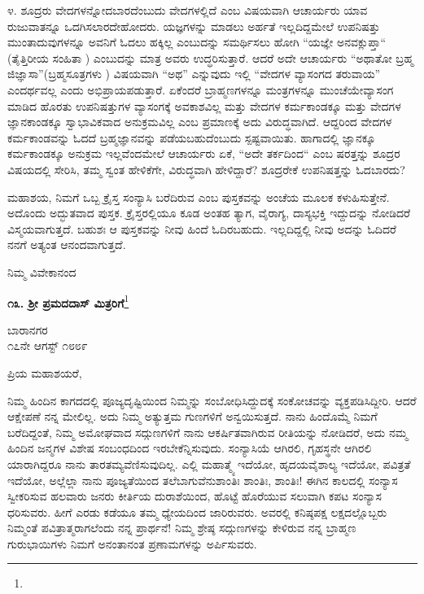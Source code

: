 ೪. ಶೂದ್ರರು ವೇದಗಳನ್ನೋದಬಾರದೆಂಬುದು ವೇದಗಳಲ್ಲಿದೆ ಎಂಬ ವಿಷಯವಾಗಿ ಆಚಾರ್ಯರು ಯಾವ ರುಜುವಾತನ್ನೂ ಒದಗಿಸಲಾರದೇಹೋದರು. ಯಜ್ಞಗಳನ್ನು ಮಾಡಲು ಅರ್ಹತೆ ಇಲ್ಲದಿದ್ದಮೇಲೆ ಉಪನಿಷತ್ತು ಮುಂತಾದುವುಗಳನ್ನೂ ಅವನಿಗೆ ಓದಲು ಹಕ್ಕಿಲ್ಲ ಎಂಬುದನ್ನು ಸಮರ್ಥಿಸಲು ಹೋಗಿ “ಯಜ್ಞೇ ಅನವಕ್ಲುಪ್ತಾ“ (ತೈತ್ತಿರೀಯ ಸಂಹಿತಾ ) ಎಂಬುದನ್ನು ಮಾತ್ರ ಅವರು ಉದ್ಧರಿಸುತ್ತಾರೆ. ಆದರೆ ಅದೇ ಆಚಾರ್ಯರು “ಅಥಾತೋ ಬ್ರಹ್ಮ ಜಿಜ್ಞಾಸಾ”(ಬ್ರಹ್ಮಸೂತ್ರಗಳು ) ವಿಷಯವಾಗಿ “ಅಥ” ಎನ್ನುವುದು ಇಲ್ಲಿ “ವೇದಗಳ ವ್ಯಾಸಂಗದ ತರುವಾಯ” ಎಂದರ್ಥವಲ್ಲ ಎಂದು ಅಭಿಪ್ರಾಯಪಡುತ್ತಾರೆ. ಏಕೆಂದರೆ ಬ್ರಾಹ್ಮಣಗಳನ್ನೂ ಮಂತ್ರಗಳನ್ನೂ ಮುಂಚೆಯೇ\break ವ್ಯಾಸಂಗ ಮಾಡಿದ ಹೊರತು ಉಪನಿಷತ್ತುಗಳ ವ್ಯಾಸಂಗಕ್ಕೆ ಅವಕಾಶವಿಲ್ಲ ಮತ್ತು ವೇದಗಳ ಕರ್ಮಕಾಂಡಕ್ಕೂ ಮತ್ತು ವೇದಗಳ ಜ್ಞಾನಕಾಂಡಕ್ಕೂ ಸ್ವಾಭಾವಿಕವಾದ ಅನುಕ್ರಮವಿಲ್ಲ ಎಂಬ ಪ್ರಮಾಣಕ್ಕೆ ಅದು ವಿರುದ್ಧವಾಗಿದೆ. ಆದ್ದರಿಂದ ವೇದಗಳ ಕರ್ಮಕಾಂಡವನ್ನು ಓದದೆ ಬ್ರಹ್ಮಜ್ಞಾನವನ್ನು ಪಡೆಯಬಹುದೆಂಬುದು ಸ್ಪಷ್ಟವಾಯಿತು. ಹಾಗಾದಲ್ಲಿ ಜ್ಞಾನಕ್ಕೂ ಕರ್ಮಕಾಂಡಕ್ಕೂ ಅನುಕ್ರಮ ಇಲ್ಲವೆಂದಮೇಲೆ ಆಚಾರ್ಯರು ಏಕೆ, “ಅದೇ ತರ್ಕದಿಂದ“ ಎಂಬ ಷರತ್ತನ್ನು ಶೂದ್ರರ ವಿಷಯದಲ್ಲಿ ಸೇರಿಸಿ, ತಮ್ಮ ಸ್ವಂತ ಹೇಳಿಕೆಗೇ, ವಿರುದ್ಧವಾಗಿ ಹೇಳಿದ್ದಾರೆ? ಶೂದ್ರರೇಕೆ ಉಪನಿಷತ್ತನ್ನು ಓದಬಾರದು?

ಮಹಾಶಯ, ನಿಮಗೆ ಒಬ್ಬ ಕ್ರೈಸ್ತ ಸಂನ್ಯಾಸಿ ಬರೆದಿರುವ  ಎಂಬ ಪುಸ್ತಕವನ್ನು ಅಂಚೆಯ ಮೂಲಕ ಕಳುಹಿಸುತ್ತೇನೆ. ಅದೊಂದು ಅದ್ಭುತವಾದ ಪುಸ್ತಕ. ಕ್ರೈಸ್ತರಲ್ಲಿಯೂ ಕೂಡ ಅಂತಹ ತ್ಯಾಗ, ವೈರಾಗ್ಯ, ದಾಸ್ಯಭಕ್ತಿ ಇದ್ದುದನ್ನು ನೋಡಿದರೆ ವಿಸ್ಮಯವಾಗುತ್ತದೆ. ಬಹುಶಃ ಆ ಪುಸ್ತಕವನ್ನು ನೀವು ಹಿಂದೆ ಓದಿರಬಹುದು. ಇಲ್ಲದಿದ್ದಲ್ಲಿ ನೀವು ಅದನ್ನು ಓದಿದರೆ ನನಗೆ ಅತ್ಯಂತ ಆನಂದವಾಗುತ್ತದೆ.

{\flushright
ನಿಮ್ಮ ವಿವೇಕಾನಂದ\par}

\vspace{-0.3cm}

\begin{center}
\textbf{೧೩. ಶ‍್ರೀ ಪ್ರಮದದಾಸ್ ಮಿತ್ರರಿಗೆ}\footnote{}
\end{center}

\vspace{-0.7cm}

\begin{flushright}
ಬಾರಾನಗರ\\೧೭ನೇ ಆಗಸ್ಟ್ ೧೮೮೯
\end{flushright}

\noindent
ಪ್ರಿಯ ಮಹಾಶಯರೆ,

ನಿಮ್ಮ ಹಿಂದಿನ ಕಾಗದದಲ್ಲಿ ಪೂಜ್ಯದೃಷ್ಟಿಯಿಂದ ನಿಮ್ಮನ್ನು ಸಂಬೋಧಿಸಿದ್ದುದಕ್ಕೆ ಸಂಕೋಚವನ್ನು ವ್ಯಕ್ತಪಡಿಸಿದ್ದೀರಿ. ಆದರೆ ಆಕ್ಷೇಪಣೆ ನನ್ನ ಮೇಲಿಲ್ಲ. ಅದು ನಿಮ್ಮ ಅತ್ಯುತ್ತಮ ಗುಣಗಳಿಗೆ ಅನ್ವಯಿಸುತ್ತದೆ. ನಾನು ಹಿಂದೊಮ್ಮೆ ನಿಮಗೆ ಬರೆದಿದ್ದಂತೆ, ನಿಮ್ಮ ಅಮೋಘವಾದ ಸದ್ಗುಣಗಳಿಗೆ ನಾನು ಆಕರ್ಷಿತವಾಗಿರುವ ರೀತಿಯನ್ನು ನೋಡಿದರೆ, ಅದು ನಮ್ಮ ಹಿಂದಿನ ಜನ್ಮಗಳ ವಿಶೇಷ ಸಂಬಂಧದಿಂದ ಇರಬೇಕೆನ್ನಿಸುವುದು. ಸಂನ್ಯಾಸಿಯೆ ಆಗಿರಲಿ, ಗೃಹಸ್ಥನೇ ಆಗಿರಲಿ ಯಾರಾಗಿದ್ದರೂ ನಾನು ತಾರತಮ್ಯವೆಣಿಸುವುದಿಲ್ಲ. ಎಲ್ಲಿ ಮಹಾತ್ಮ್ಯೆ ಇದೆಯೋ, ಹೃದಯವೈಶಾಲ್ಯ ಇದೆಯೋ, ಪವಿತ್ರತೆ ಇದೆಯೋ, ಅಲ್ಲೆಲ್ಲಾ ನಾನು ಪೂಜ್ಯತೆಯಿಂದ ತಲೆಬಾಗುವೆನು\enginline{-}ಶಾಂತಿಃ ಶಾಂತಿಃ, ಶಾಂತಿಃ! ಈಗಿನ ಕಾಲದಲ್ಲಿ ಸಂನ್ಯಾಸ ಸ್ವೀಕರಿಸುವ ಹಲವಾರು ಜನರು ಕೀರ್ತಿಯ ದುರಾಶೆಯಿಂದ, ಹೊಟ್ಟೆ \break  ಹೊರೆಯುವ ಸಲುವಾಗಿ ಕಪಟ ಸಂನ್ಯಾಸ ಧರಿಸುವರು. ಹೀಗೆ ಎರಡು ಕಡೆಯೂ ತಮ್ಮ ಧ್ಯೇಯದಿಂದ ಜಾರಿರುವರು. ಅವರಲ್ಲಿ ಕನಿಷ್ಠಪಕ್ಷ ಲಕ್ಷದಲ್ಲೊಬ್ಬರು ನಿಮ್ಮಂತೆ ಪವಿತ್ರಾತ್ಮರಾಗಲೆಂದು ನನ್ನ ಪ್ರಾರ್ಥನೆ! ನಿಮ್ಮ ಶ್ರೇಷ್ಠ ಸದ್ಗುಣಗಳನ್ನು ಕೇಳಿರುವ ನನ್ನ ಬ್ರಾಹ್ಮಣ ಗುರುಭಾಯಿಗಳು ನಿಮಗೆ ಅನಂತಾನಂತ ಪ್ರಣಾಮಗಳನ್ನು ಅರ್ಪಿಸುವರು.

